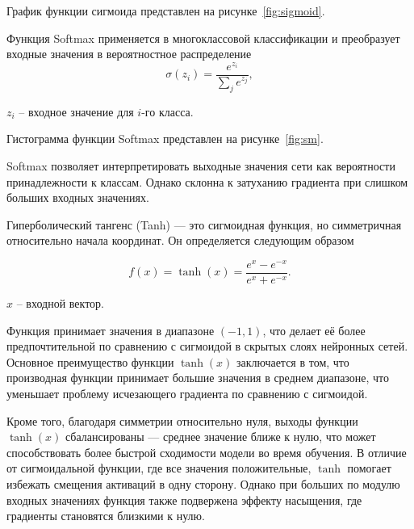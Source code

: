 График функции сигмоида представлен на рисунке~\ref{fig:sigmoid}.


\anonsection{}Функция Softmax применяется в многоклассовой классификации и 
преобразует входные значения в вероятностное распределение
\begin{equation}
    \sigma{(z_i)} = \frac{e^{z_i}}{\sum_{j} e^{z_j}},
\end{equation}

 $z_i$ – входное значение для $i$-го класса.

Гистограмма функции Softmax представлен на рисунке~\ref{fig:sm}.


Softmax позволяет интерпретировать выходные значения сети как вероятности 
принадлежности к классам. Однако склонна к затуханию градиента при слишком 
больших входных значениях.

\anonsection{}Гиперболический тангенс (Tanh) — это сигмоидная функция, но 
симметричная относительно начала координат. Он определяется следующим образом

\begin{equation}
    f(x) = \tanh(x) = \frac{e^x - e^{-x}}{e^x + e^{-x}}.
\end{equation}

 ${x}$ – входной вектор.

Функция принимает значения в диапазоне $(-1, 1)$, что делает её более 
предпочтительной по сравнению с сигмоидой в скрытых слоях нейронных сетей. 
Основное преимущество функции $\tanh(x)$ заключается в том, что производная 
функции принимает большие значения в среднем диапазоне, что уменьшает проблему 
исчезающего градиента по сравнению с сигмоидой.

Кроме того, благодаря симметрии относительно нуля, выходы функции $\tanh(x)$ 
сбалансированы — среднее значение ближе к нулю, что может способствовать более 
быстрой сходимости модели во время обучения. В отличие от сигмоидальной функции, 
где все значения положительные, $\tanh$ помогает избежать смещения активаций в 
одну сторону. Однако при больших по модулю входных значениях функция также 
подвержена эффекту насыщения, где градиенты становятся близкими к нулю.

